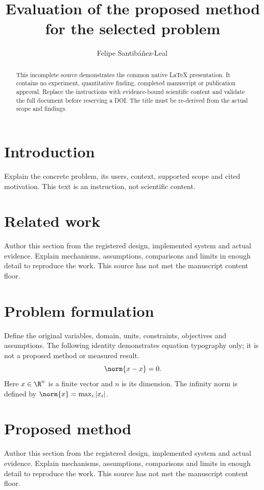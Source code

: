 \documentclass[11pt]{article}
\title{Evaluation of the proposed method for the selected problem}
\author{Felipe Santib\'a\~nez-Leal\,\orcidlink{0000-0002-0150-3246}}
\date{\docdate}
\begin{document}
\maketitle
\thispagestyle{plain}
\headerblock
\begin{abstract}
This incomplete source demonstrates the common native LaTeX presentation. It contains no experiment, quantitative finding, completed manuscript or publication approval. Replace the instructions with evidence-bound scientific content and validate the full document before reserving a DOI. The title must be re-derived from the actual scope and findings.
\end{abstract}

\section{Introduction}\label{sec:introduction}
Explain the concrete problem, its users, context, supported scope and cited motivation. This text is an instruction, not scientific content.

\section{Related work}\label{sec:related-work}
Author this section from the registered design, implemented system and actual evidence. Explain mechanisms, assumptions, comparisons and limits in enough detail to reproduce the work. This source has not met the manuscript content floor.

\section{Problem formulation}\label{sec:problem-formulation}
Define the original variables, domain, units, constraints, objectives and assumptions. The following identity demonstrates equation typography only; it is not a proposed method or measured result.
\begin{equation}\label{eq:identity} \norm{x-x} = 0. \end{equation}
Here $x\in\R^n$ is a finite vector and $n$ is its dimension. The infinity norm is defined by $\norm{x}=\max_i |x_i|$.

\section{Proposed method}\label{sec:proposed-method}
Author this section from the registered design, implemented system and actual evidence. Explain mechanisms, assumptions, comparisons and limits in enough detail to reproduce the work. This source has not met the manuscript content floor.
\end{document}
